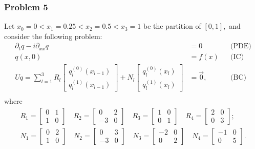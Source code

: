 \documentclass[11pt,reqno,oneside,a4paper]{article}
\theoremstyle{plain} %
\theoremstyle{definition}
\theoremstyle{remark}
\begin{document}
\subsubsection*{Problem 5}
Let $x_0 = 0 < x_1  = 0.25 < x_2 = 0.5 < x_3 = 1$ be the partition of $[0,1],$ and consider the following problem:
\begin{align*}
\partial_t q - i \partial_{xx} q &= 0 &&\text{(PDE)} \\
q(x, 0) &= f(x) &&\text{(IC)} \\
Uq = \sum^3_{l=1} R_l \begin{bmatrix} q_l^{(0)}(x_{l-1}) \\ q_l^{(1)}(x_{l-1}) \end{bmatrix} + N_l \begin{bmatrix} q_l^{(0)}(x_{l}) \\ q_l^{(1)}(x_{l}) \end{bmatrix} &= \vec{0}, &&\text{(BC)} \\
\end{align*}
where 
\begin{equation*}
\begin{aligned}
R_1 = \begin{bmatrix} 0 & 1\\ 1 & 0 \end{bmatrix} \quad R_2= \begin{bmatrix} 0 & 2  \\ -3 & 0 \end{bmatrix} \quad R_3 = \begin{bmatrix} 1 & 0 \\ 0 & 1 \end{bmatrix} \quad R_4 = \begin{bmatrix} 2 & 0 \\ 0 & 3 \end{bmatrix}; \\
N_1 = \begin{bmatrix} 0 & 2 \\ 1 & 0 \end{bmatrix} \quad N_2= \begin{bmatrix} 0 & 3  \\ -3 & 0 \end{bmatrix} \quad N_3 = \begin{bmatrix} -2 & 0 \\ 0 & 2 \end{bmatrix} \quad N_4 = \begin{bmatrix} -1 & 0 \\ 0 & 5 \end{bmatrix}.
\end{aligned}
\end{equation*}
\end{document}
